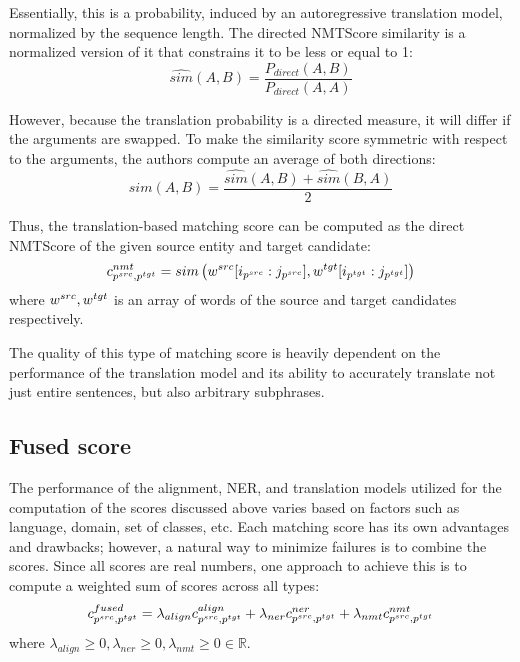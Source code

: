 Essentially, this is a probability, induced by an autoregressive translation model,
normalized by the sequence length. The directed NMTScore similarity is a normalized
version of it that constrains it to be less or equal to 1:
\[
  \widehat{sim}(A, B) = \frac{P_{direct}(A, B)}{P_{direct}(A, A)}
\]

However, because the translation probability is a directed measure,
it will differ if the arguments are swapped. To make the similarity score symmetric
with respect to the arguments, the authors compute an average of both directions:
\[
  sim(A, B) = \frac{\widehat{sim}(A, B) + \widehat{sim}(B, A)}{2}
\]

Thus, the translation-based matching score can be computed as the direct NMTScore of
the given source entity and target candidate:
\begin{equation} \label{eq:nmt_cost}
  c_{p^{src}, p^{tgt}}^{nmt} =
  sim \left(w^{src}[i_{p^{src}} : j_{p^{src}}],
  w^{tgt}[i_{p^{tgt}} : j_{p^{tgt}}] \right)
\end{equation}
where \( w^{src}, w^{tgt} \) is an array of words of the source and target
candidates respectively.

The quality of this type of matching score is heavily dependent on the performance
of the translation model and its ability to accurately translate not just entire
sentences, but also arbitrary subphrases.

\subsection{Fused score}
The performance of the alignment, NER, and translation models utilized for the
computation of the scores discussed above varies based on factors such as language,
domain, set of classes, etc. Each matching score has its own advantages and
drawbacks; however, a natural way to minimize failures is to combine the scores.
Since all scores are real numbers, one approach to achieve this is to compute a
weighted sum of scores across all types:
\begin{equation} \label{eq:fused_cost}
  c_{p^{src}, p^{tgt}}^{fused} =
  \lambda_{align} c_{p^{src}, p^{tgt}}^{align} +
  \lambda_{ner} c_{p^{src}, p^{tgt}}^{ner} +
  \lambda_{nmt} c_{p^{src}, p^{tgt}}^{nmt}
\end{equation}
where \( \lambda_{align} \geq 0, \lambda_{ner} \geq 0, \lambda_{nmt} \geq 0 \in \mathbb{R}\).

